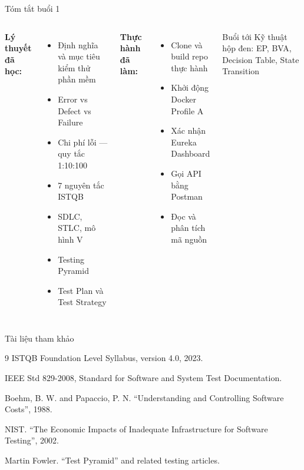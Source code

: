 \documentclass[aspectratio=169,12pt]{beamer}
\begin{document}
\begin{frame}{Tóm tắt buổi 1}
  \begin{columns}
    \textbf{Lý thuyết đã học:}
    \begin{itemize}
      \item Định nghĩa và mục tiêu kiểm thử phần mềm
      \item Error vs Defect vs Failure
      \item Chi phí lỗi --- quy tắc 1:10:100
      \item 7 nguyên tắc ISTQB
      \item SDLC, STLC, mô hình V
      \item Testing Pyramid
      \item Test Plan và Test Strategy
    \end{itemize}

    \textbf{Thực hành đã làm:}
    \begin{itemize}
      \item Clone và build repo thực hành
      \item Khởi động Docker Profile A
      \item Xác nhận Eureka Dashboard
      \item Gọi API bằng Postman
      \item Đọc và phân tích mã nguồn
    \end{itemize}

    \vspace{0.5em}
    \begin{block}{Buổi tới}
      Kỹ thuật hộp đen: EP, BVA, Decision Table, State Transition
    \end{block}
  \end{columns}
\end{frame}

\begin{frame}[shrink=1]{Tài liệu tham khảo}
  \begin{thebibliography}{9}
    ISTQB Foundation Level Syllabus, version 4.0, 2023.

    IEEE Std 829-2008, Standard for Software and System Test Documentation.

    Boehm, B. W. and Papaccio, P. N. ``Understanding and Controlling Software Costs'', 1988.

    NIST. ``The Economic Impacts of Inadequate Infrastructure for Software Testing'', 2002.

    Martin Fowler. ``Test Pyramid'' and related testing articles.
  \end{thebibliography}
\end{frame}

\end{document}
